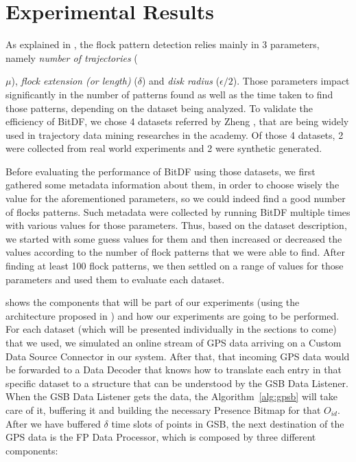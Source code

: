 \chapter{Experimental Results}
\label{chp:results}
As explained in , the flock pattern detection relies mainly in 3 parameters, namely
\textit{number of trajectories} ({$\mu$), \textit{flock extension (or length)} ($\delta$) and \textit{disk radius}
($\epsilon/2$). Those parameters impact significantly in the number of patterns found as well as the time taken to find
those patterns, depending on the dataset being analyzed. To validate the efficiency of BitDF, we chose 4 datasets
referred by Zheng \citep{survey}, that are being widely used in trajectory data mining researches in the academy. Of
those 4 datasets, 2 were collected from real world experiments and 2 were synthetic generated.

Before evaluating the performance of BitDF using those datasets, we first gathered some metadata information about them,
in order to choose wisely the value for the aforementioned parameters, so we could indeed find a good number of flocks
patterns. Such metadata were collected by running BitDF multiple times with various values for those parameters. Thus,
based on the dataset description, we started with some guess values for them and then increased or decreased the values
according to the number of flock patterns that we were able to find. After finding at least 100 flock patterns, we then
settled on a range of values for those parameters and used them to evaluate each dataset.

 shows the components that will be part of our experiments (using the architecture
proposed in ) and how our experiments are going to be performed. For each dataset (which will
be presented individually in the sections to come) that we used, we simulated an online stream of GPS data arriving on a
Custom Data Source Connector in our system. After that, that incoming GPS data would be forwarded to a Data Decoder that
knows how to translate each entry in that specific dataset to a structure that can be understood by the GSB Data
Listener. When the GSB Data Listener gets the data, the Algorithm~\ref{alg:gpsb} will take care of it, buffering it and
building the necessary Presence Bitmap for that $O_{id}$. After we have buffered $\delta$ time slots of points in GSB,
the next destination of the GPS data is the FP Data Processor, which is composed by three different components:

}
